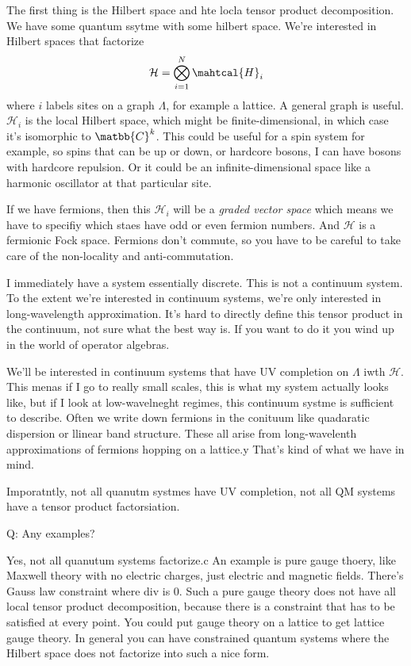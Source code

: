 The first thing is the Hilbert space and hte locla tensor product decomposition.
We have some quantum ssytme with some hilbert space.
We're interested in Hilbert spaces that factorize
\begin{align}
    \mathcal{H} = \bigotimes_{i=1}^{N}\mahtcal{H}_i
\end{align}
where $i$ labels sites on a graph $\Lambda$, for example a lattice.
A general graph is useful.
$\mathcal{H}_i$ is the local Hilbert space, which might be finite-dimensional,
in which case it's isomorphic to $\matbb{C}^k$.
This could be useful for a spin system for example,
so spins that can be up or down, 
or hardcore bosons, I can have bosons with hardcore repulsion.
Or it could be an infinite-dimensional space like a harmonic oscillator at that
particular site.

If we have fermions, then this $\mathcal{H}_i$ will be a \emph{graded vector
space}
which means we have to specifiy which staes have odd or even fermion numbers.
And $\mathcal{H}$ is a fermionic Fock space.
Fermions don't commute, so you have to be careful to take care of the
non-locality and anti-commutation.

I immediately have a system essentially discrete.
This is not a continuum system.
To the extent we're interested in continuum systems,
we're only interested in long-wavelength approximation.
It's hard to directly define this tensor product in the continuum,
not sure what the best way is.
If you want to do it you wind up in the world of operator algebras.

We'll be interested in continuum systems that have UV completion on $\Lambda$
iwth $\mathcal{H}$.
This menas if I go to really small scales, this is what my system actually looks
like, but if I look at low-wavelneght regimes, this continuum systme is
sufficient to describe.
Often we write down fermions in the conituum like quadaratic dispersion or
llinear band structure.
These all arise from long-wavelenth approximations of fermions hopping on a
lattice.y
That's kind of what we have in mind.

Imporatntly, not all quanutm systmes have UV completion, not all QM systems
have a tensor product factorsiation.

Q: Any examples?

Yes, not all quanutum systems factorize.c
An example is pure gauge thoery, like Maxwell theory with no electric charges,
just electric and magnetic fields.
There's Gauss law constraint where div is 0.
Such a pure gauge theory does not have all local tensor product decomposition,
because there is a constraint that has to be satisfied at every point.
You could put gauge theory on a lattice to get lattice gauge theory.
In general you can have constrained quantum systems where the Hilbert space does
not factorize into such a nice form.

